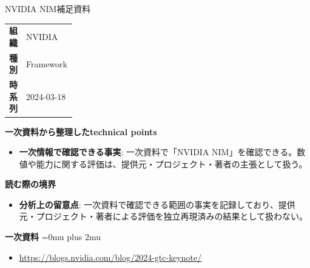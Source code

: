 \begin{technicalnote}{NVIDIA NIM}{補足資料}
\begingroup
\begin{tabularx}{\linewidth}{@{}>{\bfseries}p{0.22\linewidth}X@{}}
組織 & NVIDIA \\
種別 & Framework \\
時系列 & 2024-03-18 \\
\end{tabularx}
\smallskip
{\bfseries 一次資料から整理したtechnical points}
\begin{itemize}[leftmargin=1.5em,itemsep=0.35em]
\item \textbf{一次情報で確認できる事実}: 一次資料で「NVIDIA NIM」を確認できる。数値や能力に関する評価は、提供元・プロジェクト・著者の主張として扱う。
\end{itemize}
\begin{minipage}{\linewidth}
{\bfseries 読む際の境界}
\begin{itemize}[leftmargin=1.5em,itemsep=0.35em]
\item \textbf{分析上の留意点}: 一次資料で確認できる範囲の事実を記録しており、提供元・プロジェクト・著者による評価を独立再現済みの結果として扱わない。
\end{itemize}
\begin{samepage}
{\bfseries 一次資料}
\begingroup\sloppy
\Urlmuskip=0mu plus 2mu\relax
\begin{itemize}[leftmargin=1.5em,itemsep=0.25em]
\item {\scriptsize\url{https://blogs.nvidia.com/blog/2024-gtc-keynote/}}
\end{itemize}
\endgroup
\end{samepage}
\end{minipage}
\endgroup
\end{technicalnote}
\medskip
